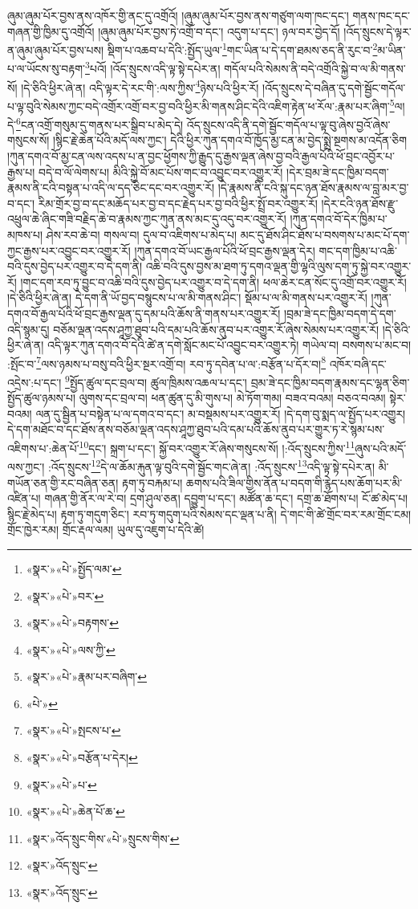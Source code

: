 ཞུམ་ཞུམ་པོར་བྱས་ནས་འཁོར་གྱི་ནང་དུ་འགྲོའོ། །ཞུམ་ཞུམ་པོར་བྱས་ནས་གཙུག་ལག་ཁང་དང་། གནས་ཁང་དང་གཞན་གྱི་ཁྱིམ་དུ་འགྲོའོ། །ཞུམ་ཞུམ་པོར་བྱས་ཏེ་འགྲོ་བ་དང་། འདུག་པ་དང་། ཉལ་བར་བྱེད་དོ། །འོད་སྲུངས་དེ་ལྟར་ན་ཞུམ་ཞུམ་པོར་བྱས་པས། སྡིག་པ་འཆབ་པ་དེའི་:སྤྱོད་ཡུལ་\footnote{«སྣར་»«པེ་»སྤྱོད་ལམ་}གང་ཡིན་པ་དེ་དག་ཐམས་ཅད་ནི་རུང་བ་\footnote{«སྣར་»«པེ་»བར་}མ་ཡིན་པ་ལ་ཡོངས་སུ་བརྟག་\footnote{«སྣར་»«པེ་»བརྟགས་}པའོ། །འོད་སྲུངས་འདི་ལྟ་སྟེ་དཔེར་ན། གདོལ་པའི་སེམས་ནི་བདེ་འགྲོའི་སྐྱེ་བ་ལ་མི་གནས་སོ། །དེ་ཅིའི་ཕྱིར་ཞེ་ན། འདི་ལྟར་དེ་རང་གི་:ལས་ཀྱིས་\footnote{«སྣར་»«པེ་»ལས་ཀྱི་}ཉེས་པའི་ཕྱིར་རོ། །འོད་སྲུངས་དེ་བཞིན་དུ་དགེ་སྦྱོང་གདོལ་པ་ལྟ་བུའི་སེམས་ཀྱང་བདེ་འགྲོར་འགྲོ་བར་བྱ་བའི་ཕྱིར་མི་གནས་ཤིང་དེའི་འཇིག་རྟེན་ཕ་རོལ་:རྣམ་པར་ཞིག་\footnote{«སྣར་»«པེ་»རྣམ་པར་བཞིག་}ལ། དེ་\footnote{«པེ་»}ངན་འགྲོ་གསུམ་དུ་གནས་པར་སྒྲིབ་པ་མེད་དེ། འོད་སྲུངས་འདི་ནི་དགེ་སྦྱོང་གདོལ་པ་ལྟ་བུ་ཞེས་བྱའོ་ཞེས་གསུངས་སོ། །སྙིང་རྗེ་ཆེན་པོའི་མདོ་ལས་ཀྱང་། དེའི་ཕྱིར་ཀུན་དགའ་བོ་ཁྱོད་མྱ་ངན་མ་བྱེད་སྨྲེ་སྔགས་མ་འདོན་ཅིག །ཀུན་དགའ་བོ་མྱ་ངན་ལས་འདས་པ་ན་བྱང་ཕྱོགས་ཀྱི་རྒྱུད་དུ་རྒྱས་ལྡན་ཞེས་བྱ་བའི་རྒྱལ་པོའི་ཕོ་བྲང་འབྱོར་པ་རྒྱས་པ། བདེ་བ་ལོ་ལེགས་པ། མིའི་སྐྱེ་བོ་མང་པོས་གང་བ་འབྱུང་བར་འགྱུར་རོ། །དེར་བྲམ་ཟེ་དང་ཁྱིམ་བདག་རྣམས་ནི་ངའི་བསྟན་པ་འདི་ལ་དད་ཅིང་དང་བར་འགྱུར་རོ། །དེ་རྣམས་ནི་ངའི་སྐུ་དང་ཉན་ཐོས་རྣམས་ལ་བླ་མར་བྱ་བ་དང་། རིམ་གྲོར་བྱ་བ་དང་མཆོད་པར་བྱ་བ་དང་རྗེད་པར་བྱ་བའི་ཕྱིར་སྤྲོ་བར་འགྱུར་རོ། །དེར་ངའི་ཉན་ཐོས་རྫུ་འཕྲུལ་ཆེ་ཞིང་གཟི་བརྗིད་ཆེ་བ་རྣམས་ཀྱང་ཀུན་ནས་མང་དུ་འདུ་བར་འགྱུར་རོ། །ཀུན་དགའ་བོ་དེར་ཁྱིམ་པ་མཁས་པ། ཤེས་རབ་ཆེ་བ། གསལ་བ། དུལ་བ་འཇིགས་པ་མེད་པ། མང་དུ་ཐོས་ཤིང་ཐོས་པ་བསགས་པ་མང་པོ་དག་ཀྱང་རྒྱས་པར་འབྱུང་བར་འགྱུར་རོ། །ཀུན་དགའ་བོ་ཡང་རྒྱལ་པོའི་ཕོ་བྲང་རྒྱས་ལྡན་དེར། གང་དག་ཁྱིམ་པ་འཆི་བའི་དུས་བྱེད་པར་འགྱུར་བ་དེ་དག་ནི། འཆི་བའི་དུས་བྱས་མ་ཐག་ཏུ་དགའ་ལྡན་གྱི་ལྷའི་ལུས་དག་ཏུ་སྐྱེ་བར་འགྱུར་རོ། །གང་དག་རབ་ཏུ་བྱུང་བ་འཆི་བའི་དུས་བྱེད་པར་འགྱུར་བ་དེ་དག་ནི། ཕལ་ཆེར་ངན་སོང་དུ་འགྲོ་བར་འགྱུར་རོ། །དེ་ཅིའི་ཕྱིར་ཞེ་ན། དེ་དག་ནི་ཡོ་བྱད་བསྙུངས་པ་ལ་མི་གནས་ཤིང་། སྡོམ་པ་ལ་མི་གནས་པར་འགྱུར་རོ། །ཀུན་དགའ་བོ་རྒྱལ་པོའི་ཕོ་བྲང་རྒྱས་ལྡན་དུ་དམ་པའི་ཆོས་ནི་གནས་པར་འགྱུར་རོ། །བྲམ་ཟེ་དང་ཁྱིམ་བདག་དེ་དག་འདི་སྙམ་དུ། བཅོམ་ལྡན་འདས་ཤཱཀྱ་ཐུབ་པའི་དམ་པའི་ཆོས་ནུབ་པར་འགྱུར་རོ་ཞེས་སེམས་པར་འགྱུར་རོ། །དེ་ཅིའི་ཕྱིར་ཞེ་ན། འདི་ལྟར་ཀུན་དགའ་བོ་དེའི་ཚེ་ན་དགེ་སློང་མང་པོ་འབྱུང་བར་འགྱུར་ཏེ། གཡེལ་བ། བསགས་པ་མང་བ། :སྤོང་བ་\footnote{«སྣར་»«པེ་»སྤངས་པ་}ལས་ཉམས་པ་བསུ་བའི་ཕྱིར་སྔར་འགྲོ་བ། རབ་ཏུ་དབེན་པ་ལ་:བརྩོན་པ་དོར་བ།\footnote{«སྣར་»«པེ་»བརྩོན་པ་དེར།} འཁོར་བཞི་དང་འདྲེས་:པ་དང་། \footnote{«སྣར་»«པེ་»པ་}སྤྱོད་ཚུལ་དང་བྲལ་བ། ཚུལ་ཁྲིམས་འཆལ་པ་དང་། བྲམ་ཟེ་དང་ཁྱིམ་བདག་རྣམས་དང་ལྷན་ཅིག་སྤྱོད་ཚུལ་ཉམས་པ། ལུགས་དང་བྲལ་བ། ཕན་ཚུན་དུ་མི་གུས་པ། མེ་ཏོག་གམ། བཟའ་བའམ། བཅའ་བའམ། སྟེར་བའམ། ལན་དུ་སྦྱིན་པ་བསྟེན་པ་ལ་དགའ་བ་དང་། མ་བསྡམས་པར་འགྱུར་རོ། །དེ་དག་བུ་སྨད་ལ་སྤྱོད་པར་འགྱུར། དེ་དག་མཐོང་བ་དང་ཐོས་ནས་བཅོམ་ལྡན་འདས་ཤཱཀྱ་ཐུབ་པའི་དམ་པའི་ཆོས་ནུབ་པར་གྱུར་ཏ་རེ་སྙམ་པས་འཇིགས་པ་:ཆེན་པོ་\footnote{«སྣར་»«པེ་»ཆེན་པོ་ཆ་}དང་། སྐྲག་པ་དང་། སྐྱོ་བར་འགྱུར་རོ་ཞེས་གསུངས་སོ། །:འོད་སྲུངས་ཀྱིས་\footnote{«སྣར་»འོད་སྲུང་གིས་«པེ་»སྲུངས་གིས་}ཞུས་པའི་མདོ་ལས་ཀྱང་། :འོད་སྲུངས་\footnote{«སྣར་»འོད་སྲུང་}དེ་ལ་ཆོམ་རྐུན་ལྟ་བུའི་དགེ་སྦྱོང་གང་ཞེ་ན། :འོད་སྲུངས་\footnote{«སྣར་»འོད་སྲུང་}འདི་ལྟ་སྟེ་དཔེར་ན། མི་གཡོན་ཅན་གྱི་རང་བཞིན་ཅན། རྟག་ཏུ་བརྐམ་པ། ཆགས་པའི་ཟིལ་གྱིས་ནོན་པ་བདག་གི་རྙེད་པས་ཆོག་པར་མི་འཛིན་པ། གཞན་གྱི་ནོར་ལ་རེ་བ། དྲག་ཤུལ་ཅན། དབྱུག་པ་དང་། མཚོན་ཆ་དང་། དགྲ་ཆ་ཐོགས་པ། ངོ་ཚ་མེད་པ། སྙིང་རྗེ་མེད་པ། རྟག་ཏུ་གདུག་ཅིང་། རབ་ཏུ་གདུག་པའི་སེམས་དང་ལྡན་པ་ནི། དེ་གང་གི་ཚེ་གྲོང་བར་རམ་གྲོང་ངམ། གྲོང་ཁྱེར་རམ། གྲོང་རྡལ་ལམ། ཡུལ་དུ་འཇུག་པ་དེའི་ཚེ། 